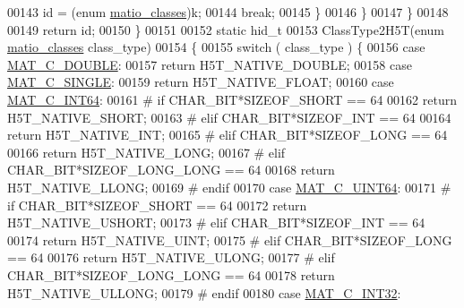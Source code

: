 \begin{DoxyCode}
00143                 \textcolor{keywordtype}{id} = (\textcolor{keyword}{enum} \hyperlink{group___m_a_t_gad4d60ae7b709fc81bfd744fb4c857c40}{matio\_classes})k;
00144                 \textcolor{keywordflow}{break};
00145             \}
00146         \}
00147     \}
00148 
00149     \textcolor{keywordflow}{return} id;
00150 \}
00151 
00152 \textcolor{keyword}{static} hid\_t
00153 ClassType2H5T(\textcolor{keyword}{enum} \hyperlink{group___m_a_t_gad4d60ae7b709fc81bfd744fb4c857c40}{matio\_classes} class\_type)
00154 \{
00155     \textcolor{keywordflow}{switch} ( class\_type ) \{
00156         \textcolor{keywordflow}{case} \hyperlink{group___m_a_t_ggad4d60ae7b709fc81bfd744fb4c857c40a5d70e0862e5bdb7bd86bf7ba5948f307}{MAT\_C\_DOUBLE}:
00157             \textcolor{keywordflow}{return} H5T\_NATIVE\_DOUBLE;
00158         \textcolor{keywordflow}{case} \hyperlink{group___m_a_t_ggad4d60ae7b709fc81bfd744fb4c857c40a2825631e26a961cbe0f79db50a39cea2}{MAT\_C\_SINGLE}:
00159             \textcolor{keywordflow}{return} H5T\_NATIVE\_FLOAT;
00160         \textcolor{keywordflow}{case} \hyperlink{group___m_a_t_ggad4d60ae7b709fc81bfd744fb4c857c40a1ea83bcde49b35477494412973f82409}{MAT\_C\_INT64}:
00161 \textcolor{preprocessor}{#       if CHAR\_BIT*SIZEOF\_SHORT == 64}
00162             \textcolor{keywordflow}{return} H5T\_NATIVE\_SHORT;
00163 \textcolor{preprocessor}{#       elif CHAR\_BIT*SIZEOF\_INT == 64}
00164             \textcolor{keywordflow}{return} H5T\_NATIVE\_INT;
00165 \textcolor{preprocessor}{#       elif CHAR\_BIT*SIZEOF\_LONG == 64}
00166             \textcolor{keywordflow}{return} H5T\_NATIVE\_LONG;
00167 \textcolor{preprocessor}{#       elif CHAR\_BIT*SIZEOF\_LONG\_LONG == 64}
00168             \textcolor{keywordflow}{return} H5T\_NATIVE\_LLONG;
00169 \textcolor{preprocessor}{#       endif}
00170         \textcolor{keywordflow}{case} \hyperlink{group___m_a_t_ggad4d60ae7b709fc81bfd744fb4c857c40a86470e25c3763d9a24623f04326195dd}{MAT\_C\_UINT64}:
00171 \textcolor{preprocessor}{#       if CHAR\_BIT*SIZEOF\_SHORT == 64}
00172             \textcolor{keywordflow}{return} H5T\_NATIVE\_USHORT;
00173 \textcolor{preprocessor}{#       elif CHAR\_BIT*SIZEOF\_INT == 64}
00174             \textcolor{keywordflow}{return} H5T\_NATIVE\_UINT;
00175 \textcolor{preprocessor}{#       elif CHAR\_BIT*SIZEOF\_LONG == 64}
00176             \textcolor{keywordflow}{return} H5T\_NATIVE\_ULONG;
00177 \textcolor{preprocessor}{#       elif CHAR\_BIT*SIZEOF\_LONG\_LONG == 64}
00178             \textcolor{keywordflow}{return} H5T\_NATIVE\_ULLONG;
00179 \textcolor{preprocessor}{#       endif}
00180         \textcolor{keywordflow}{case} \hyperlink{group___m_a_t_ggad4d60ae7b709fc81bfd744fb4c857c40adb44fc39694e3152ae5e69470a2fefe8}{MAT\_C\_INT32}:

\end{DoxyCode}
